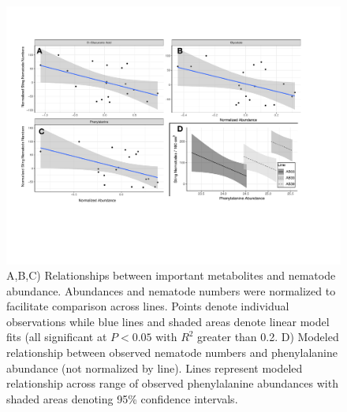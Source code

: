 \documentclass[9pt,lineno]{elife}
\begin{document}
\begin{figure}
\includegraphics[width = 0.95\linewidth]{figures/publication_figures/figure-5.pdf}
\caption{A,B,C) Relationships between important metabolites and nematode abundance.  Abundances and nematode numbers were normalized to facilitate comparison across lines.  Points denote individual observations while blue lines and shaded areas denote linear model fits (all significant at $P < 0.05$ with $R^2$ greater than 0.2.  D) Modeled relationship between observed nematode numbers and phenylalanine abundance (not normalized by line).  Lines represent modeled relationship across range of observed phenylalanine abundances with shaded areas denoting 95\% confidence intervals. }
\label{fig:figure5}
\end{figure}
\end{document}

